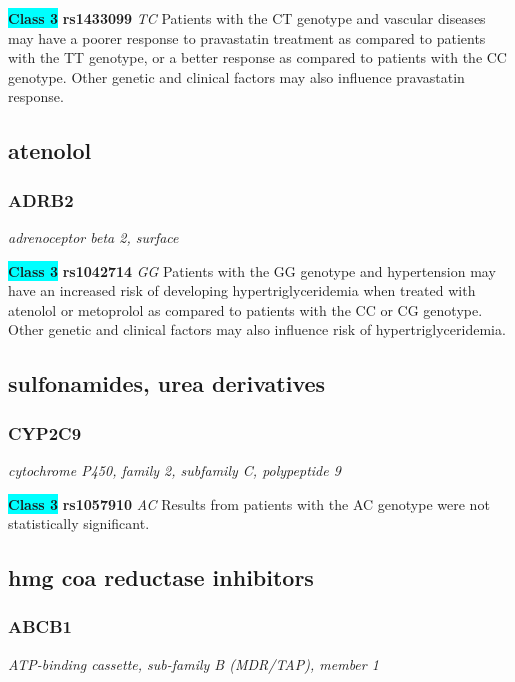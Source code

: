 \documentclass{report}
\begin{document}
\textbf{\colorbox{cyan} {Class 3}} \textbf{ rs1433099 } \textit{ TC }
Patients with the CT genotype and vascular diseases may have a poorer response to pravastatin treatment as compared to patients with the TT genotype, or a better response as compared to patients with the CC genotype. Other genetic and clinical factors may also influence pravastatin response. \newline\subsection{ atenolol }\subsubsection{ ADRB2 }
\textit{ adrenoceptor beta 2, surface }

\textbf{\colorbox{cyan} {Class 3}} \textbf{ rs1042714 } \textit{ GG }
Patients with the GG genotype and hypertension may have an increased risk of developing hypertriglyceridemia when treated with atenolol or metoprolol as compared to patients with the CC or CG genotype. Other genetic and clinical factors may also influence risk of hypertriglyceridemia. \newline\subsection{ sulfonamides, urea derivatives }\subsubsection{ CYP2C9 }
\textit{ cytochrome P450, family 2, subfamily C, polypeptide 9 }

\textbf{\colorbox{cyan} {Class 3}} \textbf{ rs1057910 } \textit{ AC }
Results from patients with the AC genotype were not statistically significant.\newline\subsection{ hmg coa reductase inhibitors }\subsubsection{ ABCB1 }
\textit{ ATP-binding cassette, sub-family B (MDR/TAP), member 1 }
\end{document}
